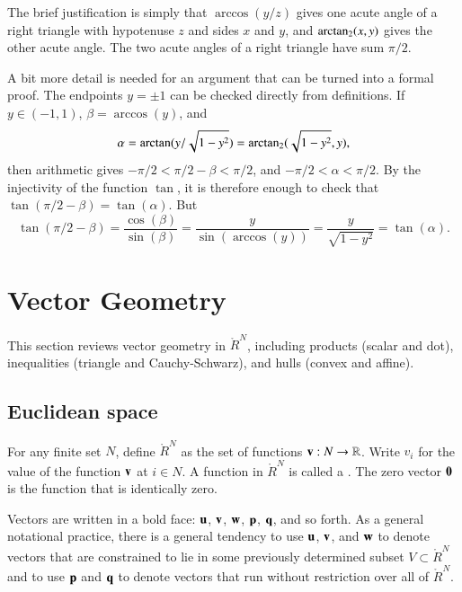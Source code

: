 \begin{proved}
The brief justification is simply that 
$\arccos(y/z)$ gives one acute angle of a right triangle with
hypotenuse $z$ and sides $x$ and $y$, and ${\operatorname{arctan_2}}(x,y)$ gives the other acute angle.
The two acute angles of a right triangle have sum $\pi/2$.

A bit more detail is needed for an argument that can be turned into a formal proof.
  The endpoints $y=\pm1$ can be checked directly from definitions.  If
  $y\in (-1,1)$, $\beta = \arccos(y)$, and \[ \alpha =
    \arctan(y/\sqrt{1-y^2}) =
    {\operatorname{arctan_2}}({\sqrt{1-y^2}},{y}),\]  then arithmetic gives
  $-\pi/2 < \pi/2 - \beta < \pi/2$, and $-\pi/2 < \alpha
    < \pi/2$.  By the injectivity of
  the function $\tan$, it is therefore enough to check that
  $\tan(\pi/2 - \beta) = \tan(\alpha)$.  But
\[ 
\tan(\pi/2-\beta)=
\frac{\cos(\beta)}{\sin(\beta)} =
\frac{y}{        \sin(\arccos(y))} 
=\frac{y}{ \sqrt{1-y^2}} 
=\tan(\alpha).
\] 
\swallowed\end{proved}



\section{Vector Geometry}

This section reviews vector geometry in $\ring{R}^N$, including
products (scalar and dot), inequalities (triangle and Cauchy-Schwarz),
and hulls (convex and affine).

\subsection{Euclidean space}

\begin{definition}
  For any finite set $N$, define $\ring{R}^N$ as the set of functions
  ${\mathbf v}:N\to\mathbb{R}$. Write $v_i$ for the value of the function ${\mathbf v}$ at
  $i\in N$.  %
  A function in $\ring{R}^N$ is called a .  The zero
  vector ${\mathbf 0}$ is the function that is identically zero.
\end{definition}
%
Vectors are written in a bold face: ${\mathbf u}$, ${\mathbf v}$, ${\mathbf w}$, ${\mathbf p}$, ${\mathbf q}$, and
so forth.  As a general notational practice, there is a general
tendency to use ${\mathbf u}$, ${\mathbf v}$, and ${\mathbf w}$ to denote vectors that are
constrained to lie in some previously determined subset $V\subset
\ring{R}^N$ and to use ${\mathbf p}$ and ${\mathbf q}$ to denote vectors that run
without restriction over all of $\ring{R}^N$.

